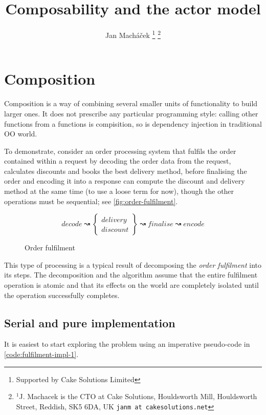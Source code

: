 \documentclass[10 pt, twocolumn]{article}
\title{Composability and the actor model}
\author{Jan Mach{\'a}\v{c}ek%
\thanks{Supported by Cake Solutions Limited}%
\thanks{$^{1}$J. Machacek is the CTO at Cake Solutions, Houldsworth Mill, Houldsworth Street, Reddish, SK5 6DA, UK {\tt\small janm at cakesolutions.net}}%
}
\begin{document}
\twocolumn[
  \begin{@twocolumnfalse}
    \maketitle
    \begin{abstract}
      
    \end{abstract}
  \end{@twocolumnfalse}
]

\section{Composition}
Composition is a way of combining several smaller units of functionality to build larger ones. It does not prescribe any particular programming style: calling other functions from a functions is compisition, so is dependency injection in traditional OO world.

To demonstrate, consider an order processing system that fulfils the order contained within a request by decoding the order data from the request, calculates discounts and books the best delivery method, before finalising the order and encoding it into a response can compute the discount and delivery method at the same time (to use a loose term for now), though the other operations must be sequential; see \autoref{fig:order-fulfilment}.

\begin{figure}[h]
  \DontPrintSemicolon
  
  \[ 
    decode \rightwavearrow
    \left \{\begin{array}{l}
      delivery \\ discount
      \end{array}
    \right \} \rightwavearrow finalise \rightwavearrow encode
  \]
  \caption{Order fulfilment}
  \label{fig:order-fulfilment}
\end{figure} 

This type of processing is a typical result of decomposing the \emph{order fulfilment} into its steps. The decomposition and the algorithm assume that the entire fulfilment operation is atomic and that its effects on the world are completely isolated until the  operation successfully completes. 

\subsection{Serial and pure implementation}
It is easiest to start exploring the problem using an imperative pseudo-code in \autoref{code:fulfilment-impl-1}.
\end{document}

